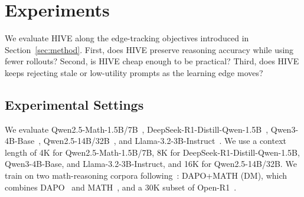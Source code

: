 
\section{Experiments}
\label{sec:experiments}
\setcounter{topnumber}{2}
We evaluate HIVE along the edge-tracking objectives introduced in Section~\ref{sec:method}. First, does HIVE preserve reasoning accuracy while using fewer rollouts? Second, is HIVE cheap enough to be practical? Third, does HIVE keeps rejecting stale or low-utility prompts as the learning edge moves?

\subsection{Experimental Settings}
 We evaluate Qwen2.5-Math-1.5B/7B~\cite{yang2024qwen25mathtechnicalreportmathematical}, DeepSeek-R1-Distill-Qwen-1.5B~\cite{guo2025deepseek}, Qwen3-4B-Base~\cite{yang2025qwen3technicalreport}, Qwen2.5-14B/32B~\cite{qwen2.5-large}, and Llama-3.2-3B-Instruct~\cite{grattafiori2024llama3}. We use a context length of 4K for Qwen2.5-Math-1.5B/7B, 8K for DeepSeek-R1-Distill-Qwen-1.5B, Qwen3-4B-Base, and Llama-3.2-3B-Instruct, and 16K for Qwen2.5-14B/32B. We train on two math-reasoning corpora following~\cite{zheng2025act}: DAPO+MATH (DM), which combines DAPO~\cite{yu2025dapo} and MATH~\cite{hendrycks2021measuringmathematicalproblemsolving}, and a 30K subset of Open-R1~\citet{openr1}.

